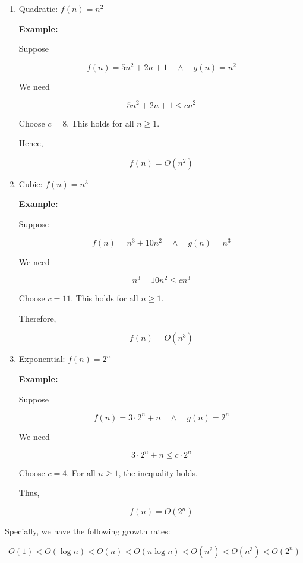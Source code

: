 \documentclass[12pt,a4paper,openany]{article}
\begin{document}
\begin{enumerate}
We need

\[
2n\log n + n \le c n\log n
\]

Choose $c = 3$. For $n \ge 2$, this holds.

In conclusion,

\[
\boxed{f(n) = O(n\log n)}
\]


\item Quadratic: $f(n) = n^2$

\textbf{Example:}

Suppose

\[
f(n) = 5n^2 + 2n + 1 \quad \land \quad g(n) = n^2
\]

We need

\[
5n^2 + 2n + 1 \le c n^2
\]

Choose $c = 8$. This holds for all $n \ge 1$.

Hence,

\[
\boxed{f(n) = O(n^2)}
\]


\item Cubic: $f(n) = n^3$

\textbf{Example:}

Suppose

\[
f(n) = n^3 + 10n^2 \quad \land \quad g(n) = n^3
\]

We need

\[
n^3 + 10n^2 \le c n^3
\]

Choose $c = 11$. This holds for all $n \ge 1$.

Therefore,

\[
\boxed{f(n) = O(n^3)}
\]

\item Exponential: $f(n) = 2^n$

\textbf{Example:}

Suppose

\[
f(n) = 3 \cdot 2^n + n \quad \land \quad g(n) = 2^n
\]

We need

\[
3 \cdot 2^n + n \le c \cdot 2^n
\]

Choose $c = 4$. For all $n \ge 1$, the inequality holds.

Thus,

\[
\boxed{f(n) = O(2^n)}
\]

\end{enumerate}

Specially, we have the following growth rates:

\[O(1) < O(\log n) < O(n) < O(n \log n) < O(n^2) < O(n^3) < O(2^n)\]
\end{document}
